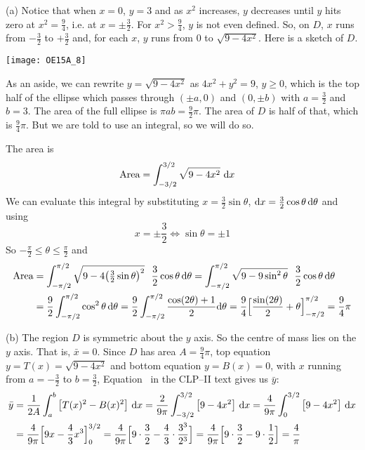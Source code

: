 \begin{solution} (a)
Notice that when $x=0$, $y=3$ and as $x^2$ increases, $y$ decreases
until $y$ hits zero at $x^2=\frac{9}{4}$, i.e. at $x=\pm\frac{3}{2}$.
For $x^2>\frac{9}{4}$, $y$ is not even defined. So, on $D$, $x$ runs from
$-\frac{3}{2}$ to $+\frac{3}{2}$ and, for each $x$, $y$ runs from $0$ to
$\sqrt{9-4x^2}$. Here is a sketch of $D$.

\begin{center}
       \texttt{[image: OE15A\_8]}
\end{center}


As an aside, we can rewrite $y=\sqrt{9-4x^2}$ as $4x^2+y^2=9$,
$y\ge 0$, which is the top half of the ellipse which passes through
$(\pm a,0)$ and $(0,\pm b)$ with $a=\frac{3}{2}$ and $b=3$. The
area of the full ellipse is $\pi ab=\frac{9}{2}\pi$. The area
of $D$ is half of that, which is $\frac{9}{4}\pi$. But we are
told to use an integral, so we will do so.

The area is
\begin{align*}
\text{Area} &= \int_{-3/2}^{3/2} \sqrt{9-4x^2} \ \mathrm{d}x
\end{align*}
We can evaluate this integral by substituting $x=\frac{3}{2}\sin\theta$,
$\mathrm{d}x = \frac{3}{2}\cos\theta\,\mathrm{d}\theta$ and using
\begin{equation*}
x=\pm\frac{3}{2} \iff \sin\theta = \pm 1
\end{equation*}
So $-\frac{\pi}{2}\le\theta\le\frac{\pi}{2}$ and
\begin{alignat*}{3}
\text{Area}
&= \int_{-\pi/2}^{\pi/2}
           \sqrt{9-4\big({\textstyle\frac{3}{2}}\sin\theta\big)^2}
    \ \  \frac{3}{2}\cos\theta\,\mathrm{d}\theta
= \int_{-\pi/2}^{\pi/2}
           \sqrt{9-9\sin^2\theta}
    \ \  \frac{3}{2}\cos\theta\,\mathrm{d}\theta
\\
&=\frac{9}{2}  \int_{-\pi/2}^{\pi/2}\cos^2\theta\,\mathrm{d}\theta
= \frac{9}{2}  \int_{-\pi/2}^{\pi/2}\frac{\cos(2\theta)+1}{2}\mathrm{d}\theta
=\frac{9}{4}\Big[\frac{\sin(2\theta)}{2}+\theta\Big]_{-\pi/2}^{\pi/2}
=\frac{9}{4}\pi
\end{alignat*}

\noindent (b)
The region $D$ is symmetric about the $y$ axis. So the
centre of mass lies on the $y$ axis. That is, $\bar x=0$.
Since $D$ has area $A=\frac{9}{4}\pi$, top equation $y=T(x)=\sqrt{9-4x^2}$
and bottom equation $y=B(x)=0$, with $x$ running from $a=-\frac{3}{2}$
to $b=\frac{3}{2}$,  Equation~ in the CLP--II text gives us $\bar y$:
\begin{alignat*}{3}
\bar y &=\frac{1}{2A}\int_a^b\big[T(x)^2-B(x)^2\big]\ \mathrm{d}x
=\frac{2}{9\pi}\int_{-3/2}^{3/2}\big[9-4x^2\big]\ \mathrm{d}x
=\frac{4}{9\pi}\int_0^{3/2}\big[9-4x^2\big]\ \mathrm{d}x
\\
&= \frac{4}{9\pi}\Big[9x-\frac{4}{3}x^3\Big]_0^{3/2}
= \frac{4}{9\pi}\Big[9\cdot\frac{3}{2}-\frac{4}{3}\cdot\frac{3^3}{2^3}\Big]
= \frac{4}{9\pi}\Big[9\cdot\frac{3}{2}-9\cdot\frac{1}{2}\Big] = \frac{4}{\pi}
\end{alignat*}

\end{solution}

